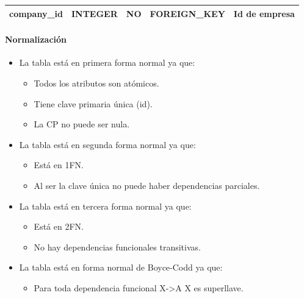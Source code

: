 \documentclass[12pt,a4paperpaper,]{report}
\providecommand{\tightlist}{%
  \setlength{\itemsep}{0pt}\setlength{\parskip}{0pt}}
\let\oldparagraph\paragraph
\renewcommand{\paragraph}[1]{\oldparagraph{#1}\mbox{}}
\begin{document}
\begin{longtable}[]{@{}lllll@{}}
\begin{minipage}[t]{0.20\columnwidth}\raggedright\strut
company\_id\strut
\end{minipage} & \begin{minipage}[t]{0.18\columnwidth}\raggedright\strut
INTEGER\strut
\end{minipage} & \begin{minipage}[t]{0.15\columnwidth}\raggedright\strut
NO\strut
\end{minipage} & \begin{minipage}[t]{0.18\columnwidth}\raggedright\strut
FOREIGN\_KEY\strut
\end{minipage} & \begin{minipage}[t]{0.15\columnwidth}\raggedright\strut
Id de empresa\strut
\end{minipage}\tabularnewline
\bottomrule
\end{longtable}

\paragraph{Normalización}\label{normalizaciuxf3n}

\begin{itemize}
\tightlist
\item
  La tabla está en primera forma normal ya que:

  \begin{itemize}
  \tightlist
  \item
    Todos los atributos son atómicos.
  \item
    Tiene clave primaria única (id).
  \item
    La CP no puede ser nula.
  \end{itemize}
\item
  La tabla está en segunda forma normal ya que:

  \begin{itemize}
  \tightlist
  \item
    Está en 1FN.
  \item
    Al ser la clave única no puede haber dependencias parciales.
  \end{itemize}
\item
  La tabla está en tercera forma normal ya que:

  \begin{itemize}
  \tightlist
  \item
    Está en 2FN.
  \item
    No hay dependencias funcionales transitivas.
  \end{itemize}
\item
  La tabla está en forma normal de Boyce-Codd ya que:

  \begin{itemize}
  \tightlist
  \item
    Para toda dependencia funcional X-\textgreater{}A X es superllave.
  \end{itemize}
\end{itemize}
\end{document}
